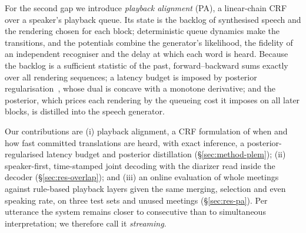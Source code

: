 For the second gap we introduce \emph{playback alignment} (PA), a linear-chain CRF over a speaker's playback queue. Its
state is the backlog of synthesised speech and the rendering chosen for each block; deterministic queue dynamics make
the transitions, and the potentials combine the generator's likelihood, the fidelity of an independent recogniser and
the delay at which each word is heard. Because the backlog is a sufficient statistic of the past, forward--backward
sums exactly over all rendering sequences; a latency budget is imposed by posterior
regularisation~\citep{ganchev2010posterior}, whose dual is concave with a monotone derivative; and the posterior,
which prices each rendering by the queueing cost it imposes on all later blocks, is distilled into the speech generator.

Our contributions are (i) playback alignment, a CRF formulation of when and how fast committed translations are heard,
with exact inference, a posterior-regularised latency budget and posterior distillation (\S\ref{sec:method-plem});
(ii) speaker-first, time-stamped joint decoding with the diarizer read inside the decoder (\S\ref{sec:res-overlap});
and (iii) an online evaluation of whole meetings against rule-based playback layers given the same merging, selection
and even speaking rate, on three test sets and unused meetings (\S\ref{sec:res-pa}). Per utterance the
system remains closer to consecutive than to simultaneous interpretation; we therefore call it \emph{streaming}.
